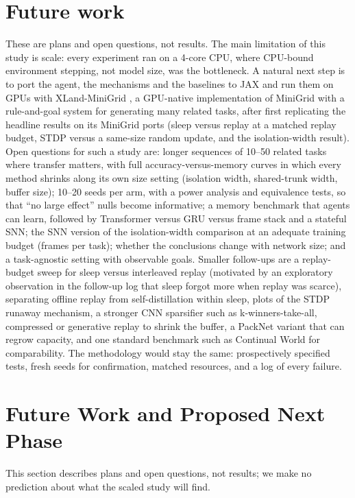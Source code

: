 \documentclass[10pt]{article}
\begin{document}
\section{Future work}
\label{sec:future}
These are plans and open questions, not results. The main limitation of this study is scale: every experiment ran on
a 4-core CPU, where CPU-bound environment stepping, not model size, was the bottleneck. A natural next step is to port
the agent, the mechanisms and the baselines to JAX and run them on GPUs with XLand-MiniGrid \citep{nikulin2024xland}, a
GPU-native implementation of MiniGrid with a rule-and-goal system for generating many related tasks, after first
replicating the headline results on its MiniGrid ports (sleep versus replay at a matched replay budget, STDP versus a
same-size random update, and the isolation-width result). Open questions for such a study are: longer sequences of
10--50 related tasks where transfer matters, with full accuracy-versus-memory curves in which every method shrinks along
its own size setting (isolation width, shared-trunk width, buffer size); 10--20 seeds per arm, with a power analysis and
equivalence tests, so that ``no large effect'' nulls become informative; a memory benchmark that agents can learn,
followed by Transformer versus GRU versus frame stack and a stateful SNN; the SNN version of the isolation-width
comparison at an adequate training budget (\framesPerTaskFiveFair frames per task); whether the conclusions change with
network size; and a task-agnostic setting with observable goals. Smaller follow-ups are a replay-budget sweep for sleep
versus interleaved replay (motivated by an exploratory observation in the follow-up log that sleep forgot more when
replay was scarce), separating offline replay from self-distillation within sleep, plots of the STDP runaway mechanism,
a stronger CNN sparsifier such as k-winners-take-all, compressed or generative replay \citep{shin2017continual} to
shrink the buffer, a PackNet variant that can regrow capacity, and one standard benchmark such as Continual World
\citep{wolczyk2021continual} for comparability. The methodology would stay the same: prospectively specified tests,
fresh seeds for confirmation, matched resources, and a log of every failure.
\else
\section{Future Work and Proposed Next Phase}
\label{sec:future}
This section describes plans and open questions, not results; we make no prediction about what the scaled study will
find.
\end{document}
